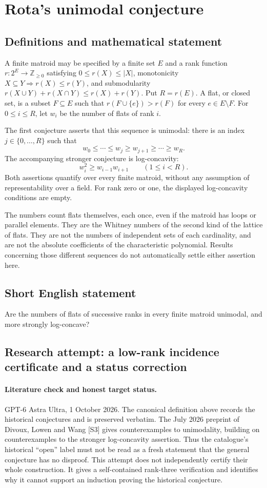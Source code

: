 \documentclass[11pt,a4paper]{article}
\begin{document}
\section*{Rota's unimodal conjecture}\label{statement}

\subsection{Definitions and mathematical statement}
A finite matroid may be specified by a finite set $E$ and a rank function
$r:2^E\to\mathbb Z_{\ge0}$ satisfying $0\le r(X)\le|X|$,
monotonicity $X\subseteq Y\Rightarrow r(X)\le r(Y)$, and submodularity
$r(X\cup Y)+r(X\cap Y)\le r(X)+r(Y)$. Put $R=r(E)$.
A flat, or closed set, is a subset $F\subseteq E$ such that
$r(F\cup\{e\})>r(F)$ for every $e\in E\setminus F$.
For $0\le i\le R$, let $w_i$ be the number of flats of rank $i$.

The first conjecture asserts that this sequence is unimodal: there is
an index $j\in\{0,\ldots,R\}$ such that
\[
 w_0\le\cdots\le w_j\ge w_{j+1}\ge\cdots\ge w_R.
\]
The accompanying stronger conjecture is log-concavity:
\[
 w_i^2\ge w_{i-1}w_{i+1}\qquad(1\le i<R).
\]
Both assertions quantify over every finite matroid, without any assumption
of representability over a field. For rank zero or one, the displayed
log-concavity conditions are empty.

The numbers count flats themselves, each once, even if the matroid has
loops or parallel elements. They are the Whitney numbers of the second
kind of the lattice of flats. They are not the numbers of independent
sets of each cardinality, and are not the absolute coefficients of the
characteristic polynomial. Results concerning those different sequences
do not automatically settle either assertion here.
\subsection{Short English statement}
Are the numbers of flats of successive ranks in every finite matroid unimodal, and more strongly log-concave?
\subsection{Research attempt: a low-rank incidence certificate and a status correction}
\paragraph{Literature check and honest target status.}
GPT-6 Astra Ultra, 1 October 2026. The canonical definition above records
the historical conjectures and is preserved verbatim. The July 2026
preprint of Divoux, Lowen and Wang [S3] gives counterexamples to
unimodality, building on counterexamples to the stronger log-concavity
assertion. Thus the catalogue's historical ``open'' label must not be
read as a fresh statement that the general conjecture has no disproof.
This attempt does not independently certify their whole construction.
It gives a self-contained rank-three verification and identifies why
it cannot support an induction proving the historical conjecture.
\end{document}
